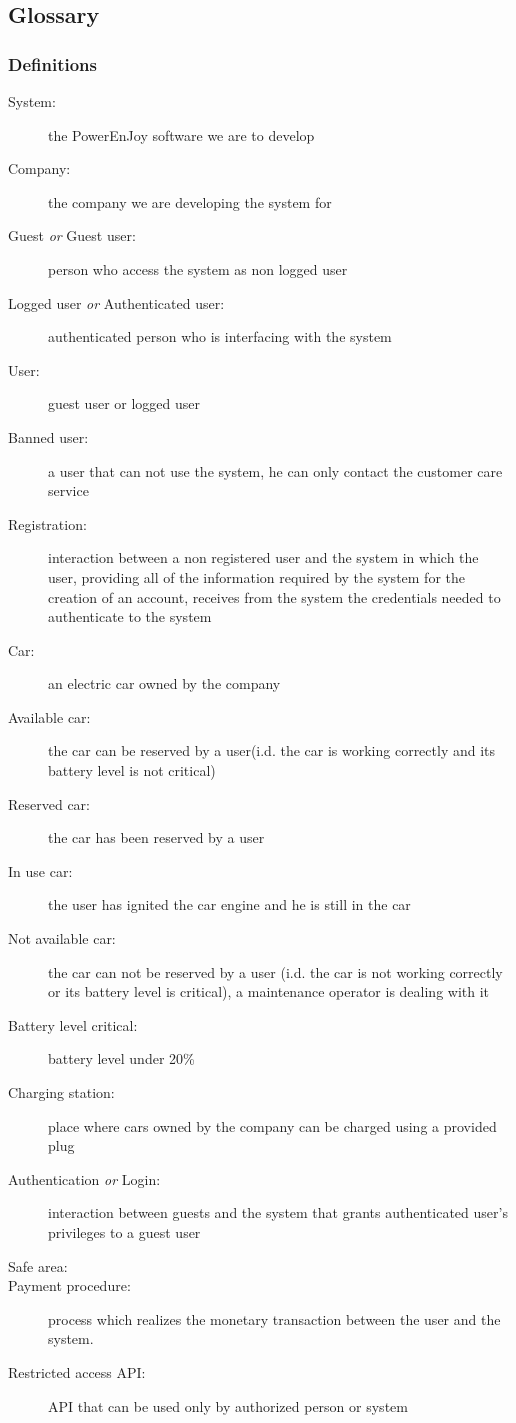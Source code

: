 \subsection{Glossary}
	\subsubsection{Definitions}
	\begin{description}
		\item[System:]the PowerEnJoy software we are to develop
		\item[Company:] the company we are developing the system for
		\item[Guest \emph{or} Guest user:] person who access the system as non logged user
		\item[Logged user \emph{or} Authenticated user:] authenticated person who is interfacing with the system
		\item[User:]  guest user or logged user
		\item[Banned user:] a user that can not use the system, he can only contact the customer care service
		\item[Registration:]  interaction between a non registered user and the system in which the user, providing all of the information required by the system for the creation of an account, receives from the system the credentials needed to authenticate to the system
		\item[Car:] an electric car owned by the company
		\item[Available car:] the car can be reserved by a user(i.d. the car is working correctly and its battery level is not critical)
		\item[Reserved car:] the car has been reserved by a user
		\item[In use car:] the user has ignited the car engine and he is still in the car
		\item[Not available car:] the car can not be reserved by a user (i.d. the car is not working correctly or its battery level is critical), a maintenance operator is dealing with it
		\item[Battery level critical:] battery level under 20\%
		\item[Charging station:] place where cars owned by the company can be charged using a provided plug
		\item[Authentication \emph{or} Login:] interaction between guests and the system that grants authenticated user's privileges to a guest user
		\item[Safe area:]
		\item[Payment procedure:] process which realizes the monetary transaction between the user and the system.
		\item[Restricted access API:] API that can be used only by authorized person or system
	\end{description}
